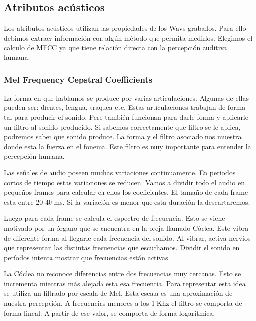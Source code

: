 \subsection{Atributos acústicos}

Los atributos acústicos utilizan las propiedades de los Wavs grabados. Para ello debimos extraer información con algún método que permita medirlos. Elegimos el calculo de MFCC ya que tiene relación directa con la percepción auditiva humana. 

\subsubsection{Mel Frequency Cepstral Coefficients}


La forma en que hablamos se produce por varias articulaciones. Algunas de ellas pueden ser: dientes, lengua, traquea etc. Estas articulaciones trabajan de forma tal para producir el sonido. Pero también funcionan para darle forma y aplicarle un filtro al sonido producido. Si sabemos correctamente que filtro se le aplica, podremos saber que sonido produce. La forma y el filtro asociado nos muestra donde esta la fuerza en el fonema. Este filtro es muy importante para entender la percepción humana.

Las señales de audio poseen muchas variaciones continuamente. En periodos cortos de tiempo estas variaciones se reducen. Vamos a dividir todo el audio en pequeños frames para calcular en ellos los coeficientes. El tamaño de cada frame esta entre 20-40 ms. Si la variación es menor que esta duración la descartaremos.

Luego para cada frame se calcula el espectro de frecuencia. Esto se viene motivado por un órgano que se encuentra en la oreja llamado Cóclea. Este vibra de diferente forma al llegarle cada frecuencia del sonido. Al vibrar, activa nervios que representan las distintas frecuencias que escuchamos. Dividir el sonido en períodos intenta mostrar que frecuencias están activas.

La Cóclea no reconoce diferencias entre dos frecuencias muy cercanas. Esto se incrementa mientras más alejada esta esa frecuencia. Para representar esta idea se utiliza un filtrado por escala de Mel. Esta escala es una aproximación de nuestra percepción. A frecuencias menores a los 1 Khz el filtro se comporta de forma lineal. A partir de ese valor, se comporta de forma logarítmica. 

